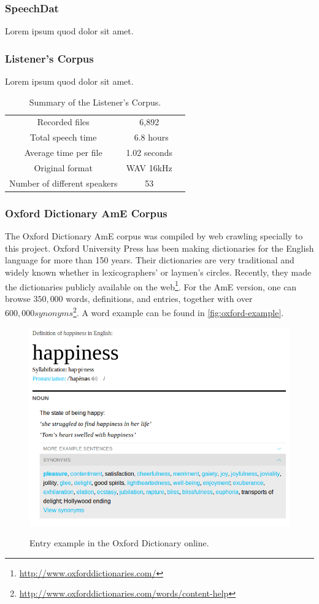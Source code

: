 \clearpage
\subsubsection{SpeechDat}
Lorem ipsum quod dolor sit amet.

\subsubsection{Listener's Corpus}
Lorem ipsum quod dolor sit amet.

\begin{table}[H]
\caption[Summary of Listener's Corpus.]{Summary of the Listener's Corpus.}
\smallskip
\centering
\begin{tabular}{ccc} \toprule
  Recorded files & 6,892 \\
  Total speech time & ~6.8 hours \\
  Average time per file & 1.02 seconds \\
  Original format & WAV 16kHz \\
  Number of different speakers & 53 \\
  \bottomrule
\end{tabular}
\end{table}

\clearpage
\subsubsection{Oxford Dictionary AmE Corpus}
The Oxford Dictionary \ac{AmE} corpus was compiled by web crawling specially to this project. Oxford University Press
has been making dictionaries for the English language for more than 150 years. Their dictionaries are very traditional and widely 
known whether in lexicographers' or laymen's circles. Recently, they made the dictionaries publicly available
on the web\footnote{\url{http://www.oxforddictionaries.com/}}. For the \ac{AmE} version, one can browse $350,000$ words, definitions, 
and entries, together with over $600,000 synonyms$\footnote{\url{http://www.oxforddictionaries.com/words/content-help}}.
A word example can be found in \autoref{fig:oxford-example}.

\begin{figure}[H]
        \myfloatalign
        {\includegraphics[width=.66\linewidth]{gfx/example-oxford-definition.png}}
        \caption{Entry example in the Oxford Dictionary online.}
        \label{fig:oxford-example}
\end{figure}

